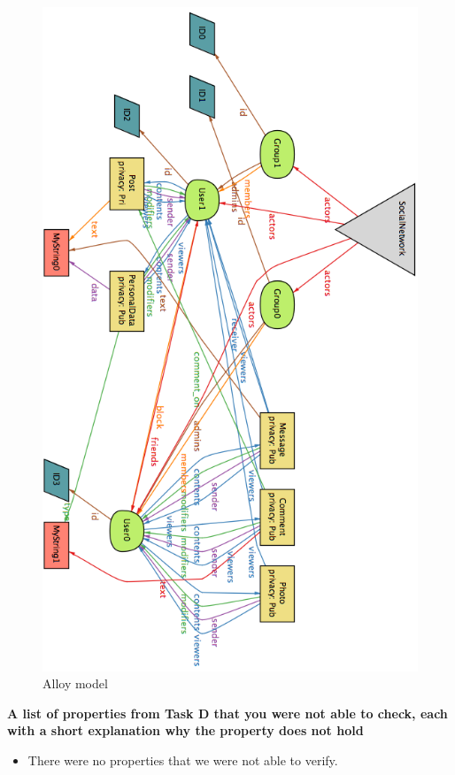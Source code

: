 \documentclass[pdftex,12pt,a4paper]{scrartcl}
\begin{document}
\begin{figure}
\centering
\includegraphics[scale=0.65]{alloy_model.png}
\caption{Alloy model}
\label{alloy_model}
\end{figure}

\newpage
{\bf A list of properties from Task D that you were not able to check, each with a short explanation why the property does not hold }
\begin{itemize}
  \item There were no properties that we were not able to verify.
\end{itemize}
\end{document}
